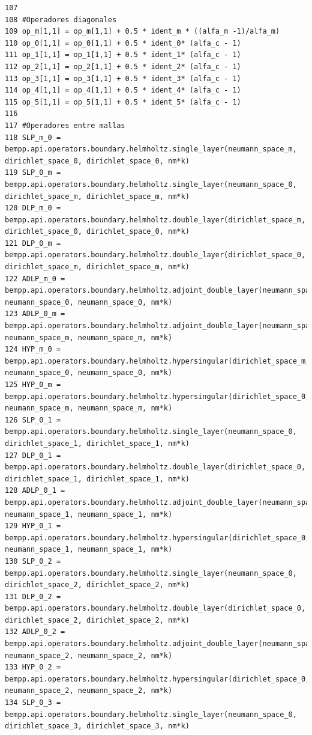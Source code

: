 \documentclass[12pt,letterpaper]{article}
\numberwithin{equation}{section}
\begin{document}
\begin{lstlisting}
107 
108 #Operadores diagonales
109 op_m[1,1] = op_m[1,1] + 0.5 * ident_m * ((alfa_m -1)/alfa_m)
110 op_0[1,1] = op_0[1,1] + 0.5 * ident_0* (alfa_c - 1)
111 op_1[1,1] = op_1[1,1] + 0.5 * ident_1* (alfa_c - 1)
112 op_2[1,1] = op_2[1,1] + 0.5 * ident_2* (alfa_c - 1)
113 op_3[1,1] = op_3[1,1] + 0.5 * ident_3* (alfa_c - 1)
114 op_4[1,1] = op_4[1,1] + 0.5 * ident_4* (alfa_c - 1)
115 op_5[1,1] = op_5[1,1] + 0.5 * ident_5* (alfa_c - 1)
116 
117 #Operadores entre mallas
118 SLP_m_0 = bempp.api.operators.boundary.helmholtz.single_layer(neumann_space_m, dirichlet_space_0, dirichlet_space_0, nm*k)
119 SLP_0_m = bempp.api.operators.boundary.helmholtz.single_layer(neumann_space_0, dirichlet_space_m, dirichlet_space_m, nm*k)
120 DLP_m_0 = bempp.api.operators.boundary.helmholtz.double_layer(dirichlet_space_m, dirichlet_space_0, dirichlet_space_0, nm*k)
121 DLP_0_m = bempp.api.operators.boundary.helmholtz.double_layer(dirichlet_space_0, dirichlet_space_m, dirichlet_space_m, nm*k)
122 ADLP_m_0 = bempp.api.operators.boundary.helmholtz.adjoint_double_layer(neumann_space_m, neumann_space_0, neumann_space_0, nm*k)
123 ADLP_0_m = bempp.api.operators.boundary.helmholtz.adjoint_double_layer(neumann_space_0, neumann_space_m, neumann_space_m, nm*k)
124 HYP_m_0 = bempp.api.operators.boundary.helmholtz.hypersingular(dirichlet_space_m, neumann_space_0, neumann_space_0, nm*k)
125 HYP_0_m = bempp.api.operators.boundary.helmholtz.hypersingular(dirichlet_space_0, neumann_space_m, neumann_space_m, nm*k)
126 SLP_0_1 = bempp.api.operators.boundary.helmholtz.single_layer(neumann_space_0, dirichlet_space_1, dirichlet_space_1, nm*k)
127 DLP_0_1 = bempp.api.operators.boundary.helmholtz.double_layer(dirichlet_space_0, dirichlet_space_1, dirichlet_space_1, nm*k)
128 ADLP_0_1 = bempp.api.operators.boundary.helmholtz.adjoint_double_layer(neumann_space_0, neumann_space_1, neumann_space_1, nm*k)
129 HYP_0_1 = bempp.api.operators.boundary.helmholtz.hypersingular(dirichlet_space_0, neumann_space_1, neumann_space_1, nm*k)
130 SLP_0_2 = bempp.api.operators.boundary.helmholtz.single_layer(neumann_space_0, dirichlet_space_2, dirichlet_space_2, nm*k)
131 DLP_0_2 = bempp.api.operators.boundary.helmholtz.double_layer(dirichlet_space_0, dirichlet_space_2, dirichlet_space_2, nm*k)
132 ADLP_0_2 = bempp.api.operators.boundary.helmholtz.adjoint_double_layer(neumann_space_0, neumann_space_2, neumann_space_2, nm*k)
133 HYP_0_2 = bempp.api.operators.boundary.helmholtz.hypersingular(dirichlet_space_0, neumann_space_2, neumann_space_2, nm*k)
134 SLP_0_3 = bempp.api.operators.boundary.helmholtz.single_layer(neumann_space_0, dirichlet_space_3, dirichlet_space_3, nm*k)

\end{lstlisting}
\end{document}
